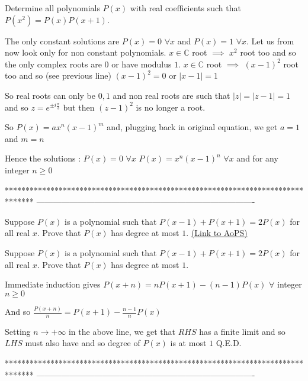 \begin{solution}
	\begin{tcolorbox}Determine all polynomials $ P(x) $ with real coefficients such that $ P(x^2)=P(x)P(x+1) $.\end{tcolorbox}
The only constant solutions are $P(x)=0$ $\forall x$ and $P(x)=1$ $\forall x$. Let us from now look only for non constant polynomials.
$x\in\mathbb C$ root $\implies$ $x^2$ root too and so the only complex roots are $0$ or have modulus $1$.
$x\in\mathbb C$ root $\implies$ $(x-1)^2$ root too and so (see previous line) $(x-1)^2=0$ or $|x-1|=1$

So real roots can only be $0,1$ and non real roots are such that $|z|=|z-1|=1$ and so $z=e^{\pm i\frac{\pi}3}$ but then $(z-1)^2$ is no longer a root.

So $P(x)=ax^n(x-1)^m$  and, plugging back in original equation, we get $a=1$ and $m=n$

Hence the solutions :
$P(x)=0$ $\forall x$
$P(x)=x^n(x-1)^n$ $\forall x$ and for any integer $n\ge 0$
\end{solution}
*******************************************************************************
-------------------------------------------------------------------------------

\begin{problem}
	Suppose $ P(x) $ is a polynomial such that $ P(x-1)+P(x+1)=2P(x) $ for all real $ x $.
Prove that $ P(x) $ has degree at most $ 1 $.
	\flushright \href{https://artofproblemsolving.com/community/c6h476930}{(Link to AoPS)}
\end{problem}



\begin{solution}
	\begin{tcolorbox}Suppose $ P(x) $ is a polynomial such that $ P(x-1)+P(x+1)=2P(x) $ for all real $ x $.
Prove that $ P(x) $ has degree at most $ 1 $.\end{tcolorbox}
Immediate induction gives $P(x+n)=nP(x+1)-(n-1)P(x)$ $\forall$ integer $n\ge 0$

And so $\frac{P(x+n)}n=P(x+1)-\frac{n-1}nP(x)$

Setting $n\to +\infty$ in the above line, we get that $RHS$ has a finite limit and so $LHS$ must also have and so degree of $P(x)$ is at most $1$
Q.E.D.
\end{solution}
*******************************************************************************
-------------------------------------------------------------------------------

